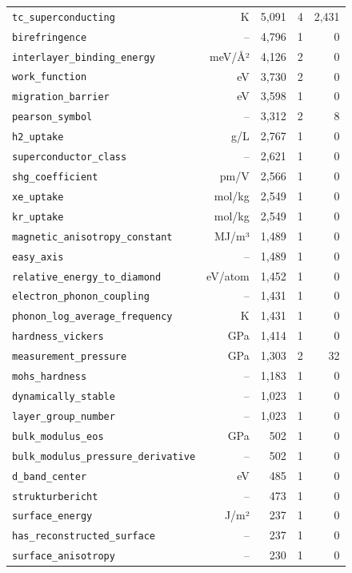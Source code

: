 \begin{longtable}{lrrrr}
\texttt{tc\_superconducting} & K & 5{,}091 & 4 & 2{,}431 \\
\texttt{birefringence} & -- & 4{,}796 & 1 & 0 \\
\texttt{interlayer\_binding\_energy} & meV/Å² & 4{,}126 & 2 & 0 \\
\texttt{work\_function} & eV & 3{,}730 & 2 & 0 \\
\texttt{migration\_barrier} & eV & 3{,}598 & 1 & 0 \\
\texttt{pearson\_symbol} & -- & 3{,}312 & 2 & 8 \\
\texttt{h2\_uptake} & g/L & 2{,}767 & 1 & 0 \\
\texttt{superconductor\_class} & -- & 2{,}621 & 1 & 0 \\
\texttt{shg\_coefficient} & pm/V & 2{,}566 & 1 & 0 \\
\texttt{xe\_uptake} & mol/kg & 2{,}549 & 1 & 0 \\
\texttt{kr\_uptake} & mol/kg & 2{,}549 & 1 & 0 \\
\texttt{magnetic\_anisotropy\_constant} & MJ/m³ & 1{,}489 & 1 & 0 \\
\texttt{easy\_axis} & -- & 1{,}489 & 1 & 0 \\
\texttt{relative\_energy\_to\_diamond} & eV/atom & 1{,}452 & 1 & 0 \\
\texttt{electron\_phonon\_coupling} & -- & 1{,}431 & 1 & 0 \\
\texttt{phonon\_log\_average\_frequency} & K & 1{,}431 & 1 & 0 \\
\texttt{hardness\_vickers} & GPa & 1{,}414 & 1 & 0 \\
\texttt{measurement\_pressure} & GPa & 1{,}303 & 2 & 32 \\
\texttt{mohs\_hardness} & -- & 1{,}183 & 1 & 0 \\
\texttt{dynamically\_stable} & -- & 1{,}023 & 1 & 0 \\
\texttt{layer\_group\_number} & -- & 1{,}023 & 1 & 0 \\
\texttt{bulk\_modulus\_eos} & GPa & 502 & 1 & 0 \\
\texttt{bulk\_modulus\_pressure\_derivative} & -- & 502 & 1 & 0 \\
\texttt{d\_band\_center} & eV & 485 & 1 & 0 \\
\texttt{strukturbericht} & -- & 473 & 1 & 0 \\
\texttt{surface\_energy} & J/m² & 237 & 1 & 0 \\
\texttt{has\_reconstructed\_surface} & -- & 237 & 1 & 0 \\
\texttt{surface\_anisotropy} & -- & 230 & 1 & 0 \\

\end{longtable}
